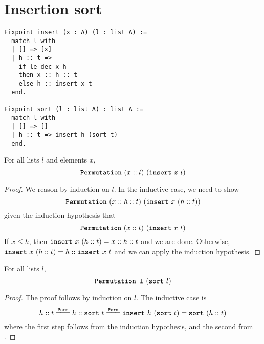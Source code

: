 \documentclass[sigplan,10pt,anonymous,review]{thesis}
\begin{document}
\section{Insertion sort}
\label{appendix:insertion_sort}

\begin{lstlisting}
Fixpoint insert (x : A) (l : list A) :=
  match l with
  | [] => [x]
  | h :: t =>
    if le_dec x h
    then x :: h :: t
    else h :: insert x t
  end.

Fixpoint sort (l : list A) : list A :=
  match l with
  | [] => []
  | h :: t => insert h (sort t)
  end.
\end{lstlisting}

\begin{lemma}
  For all lists $l$ and elements $x$,
  \begin{equation*}
    \texttt{\textup{Permutation}}~(x::l)~(\texttt{\textup{insert}}~x~l)
  \end{equation*}
\end{lemma}
\begin{proof}
  We reason by induction on $l$. In the inductive case, we need to show
  \begin{equation*}
    \texttt{\textup{Permutation}}~(x::h::t)~(\texttt{\textup{insert}}~x~(h::t))
  \end{equation*}
  given the induction hypothesis that
  \begin{equation*}
    \texttt{\textup{Permutation}}~(x::t)~(\texttt{\textup{insert}}~x~t)
  \end{equation*}
  If $x \le h$, then $\texttt{\textup{insert}}~x~(h::t) = x :: h :: t$ and we are
  done. Otherwise, $\texttt{\textup{insert}}~x~(h::t) = h :: \texttt{\textup{insert}}~x~t$ and
  we can apply the induction hypothesis.
\end{proof}

\begin{theorem}
  For all lists $l$,
  \begin{equation*}
    \texttt{\textup{Permutation~l}}~(\texttt{\textup{sort}}~l)
  \end{equation*}
\end{theorem}
\begin{proof}
  The proof follows by induction on $l$. The inductive case is
  \begin{equation*}
    h :: t \eqperm h :: \var{sort}~t \eqperm
    \var{insert}~h~(\var{sort}~t) = \var{sort}~(h :: t)
  \end{equation*}
  where the first step follows from the induction hypothesis, and the
  second from .
\end{proof}
\end{document}
